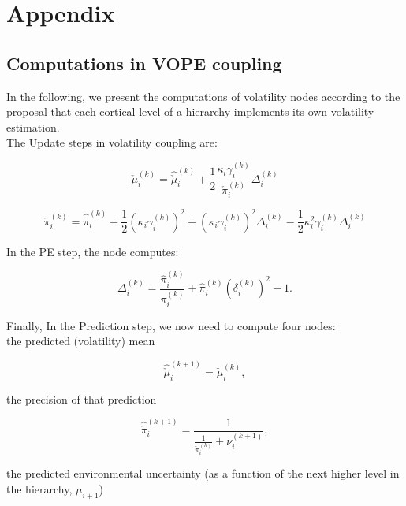 \section{Appendix}

\subsection{Computations in VOPE coupling}

In the following, we present the computations of volatility nodes according to the proposal that each cortical level of a hierarchy implements its own volatility estimation.\\

The \textsf{Update} steps in volatility coupling are:

\begin{equation}
	\check{\mu}_i^{(k)} = \hat{\check{\mu}}_i^{(k)} + \frac{1}{2} \frac{\kappa_i \gamma_{i}^{(k)}}{\check{\pi}_i^{(k)}} \Delta_{i}^{(k)}
\end{equation}

\begin{equation}
	\check{\pi}_i^{(k)} = \hat{\check{\pi}}_i^{(k)} + \frac{1}{2} (\kappa_i \gamma_{i}^{(k)})^2 + (\kappa_i \gamma_{i}^{(k)})^2 \Delta_{i}^{(k)} - \frac{1}{2} \kappa_i^2 \gamma_{i}^{(k)} \Delta_{i}^{(k)}
\end{equation}

In the \textsf{PE} step, the node computes:

\begin{equation}
  \Delta_i^{(k)} = \frac{\hat{\pi}_i^{(k)}}{\pi_{i}^{(k)}} + \hat{\pi}_i^{(k)} (\delta_i^{(k)})^2 - 1. 
\end{equation}

Finally, In the \textsf{Prediction} step, we now need to compute four nodes: \\
the predicted (volatility) mean

\begin{equation}
	\hat{\check{\mu}}_i^{(k+1)} = \check{\mu}_i^{(k)},
\end{equation}

the precision of that prediction

\begin{equation}
  \hat{\check{\pi}}_i^{(k+1)} = \frac{1}{\frac{1}{\check{\pi}_i^{(k)}} + \nu_i^{(k+1)}}, 
\end{equation}

the predicted environmental uncertainty (as a function of the next higher level in the hierarchy, $\mu_{i+1}$)

